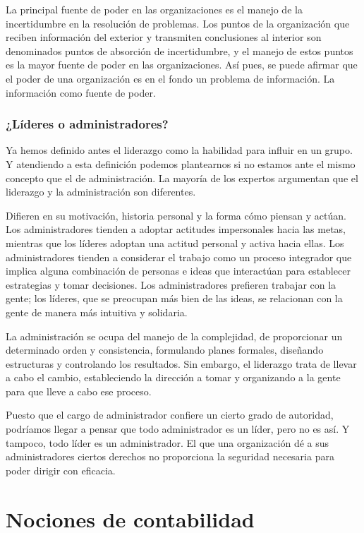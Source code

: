 \documentclass[
]{krantz}
\begin{document}
La principal fuente de poder en las organizaciones es el manejo de la incertidumbre en la resolución de problemas. Los puntos de la organización que reciben información del exterior y transmiten conclusiones al interior son denominados puntos de absorción de incertidumbre, y el manejo de estos puntos es la mayor fuente de poder en las organizaciones. Así pues, se puede afirmar que el poder de una organización es en el fondo un problema de información. La información como fuente de poder.

\hypertarget{luxedderes-o-administradores}{%
\subsection{¿Líderes o administradores?}\label{luxedderes-o-administradores}}

Ya hemos definido antes el liderazgo como la habilidad para influir en un grupo. Y atendiendo a esta definición podemos plantearnos si no estamos ante el mismo concepto que el de administración. La mayoría de los expertos argumentan que el liderazgo y la administración son diferentes.

Difieren en su motivación, historia personal y la forma cómo piensan y actúan. Los administradores tienden a adoptar actitudes impersonales hacia las metas, mientras que los líderes adoptan una actitud personal y activa hacia ellas. Los administradores tienden a considerar el trabajo como un proceso integrador que implica alguna combinación de personas e ideas que interactúan para establecer estrategias y tomar decisiones. Los administradores prefieren trabajar con la gente; los líderes, que se preocupan más bien de las ideas, se relacionan con la gente de manera más intuitiva y solidaria.

La administración se ocupa del manejo de la complejidad, de proporcionar un determinado orden y consistencia, formulando planes formales, diseñando estructuras y controlando los resultados. Sin embargo, el liderazgo trata de llevar a cabo el cambio, estableciendo la dirección a tomar y organizando a la gente para que lleve a cabo ese proceso.

Puesto que el cargo de administrador confiere un cierto grado de autoridad, podríamos llegar a pensar que todo administrador es un líder, pero no es así. Y tampoco, todo líder es un administrador. El que una organización dé a sus administradores ciertos derechos no proporciona la seguridad necesaria para poder dirigir con eficacia.

\hypertarget{nociones-de-contabilidad}{%
\chapter{Nociones de contabilidad}\label{nociones-de-contabilidad}}
\end{document}
